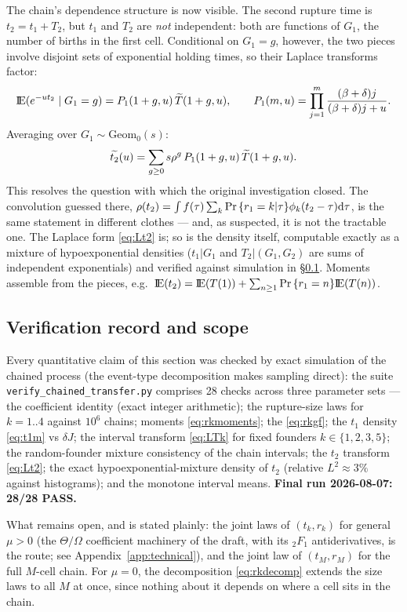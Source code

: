 The chain's dependence structure is now visible. The second rupture time is
$t_2=t_1+T_2$, but $t_1$ and $T_2$ are \emph{not} independent: both are
functions of $G_1$, the number of births in the first cell. Conditional on
$G_1=g$, however, the two pieces involve disjoint sets of exponential
holding times, so their Laplace transforms factor:
\begin{equation}
{\rm I}\!{\rm E}(e^{-ut_2}\mid G_1=g)
=P_1(1+g,u)\,\widetilde{T}(1+g,u),
\qquad
P_1(m,u)=\prod_{j=1}^{m}\frac{(\beta+\delta)j}{(\beta+\delta)j+u}.
\end{equation}
Averaging over $G_1\sim\mathrm{Geom}_0(s)$:
\begin{equation}
\widetilde{t_2}(u)
=\sum_{g\ge0} s\rho^g\,P_1(1+g,u)\,\widetilde{T}(1+g,u).
\label{eq:Lt2}
\end{equation}
This resolves the question with which the original investigation closed. The
convolution guessed there,
$\rho(t_2)=\int f(\tau)\sum_k{\text{Pr}\left\{r_1=k|\tau\right\}}\phi_k(t_2-\tau){\rm d}\tau$,
is the same statement in different clothes --- and, as suspected, it is not
the tractable one. The Laplace form \eqref{eq:Lt2} is; so is the density
itself, computable exactly as a mixture of hypoexponential densities
($t_1|G_1$ and $T_2|(G_1,G_2)$ are sums of independent exponentials) and
verified against simulation in \S\ref{sec:chained-verification}. Moments
assemble from the pieces, e.g.\
${\rm I}\!{\rm E}(t_2)={\rm I}\!{\rm E}(T(1))+\sum_{n\ge1}{\text{Pr}\left\{r_1=n\right\}}{\rm I}\!{\rm E}(T(n))$.

\subsection{Verification record and scope}
\label{sec:chained-verification}

Every quantitative claim of this section was checked by exact simulation of
the chained process (the event-type decomposition makes sampling direct):
the suite \texttt{verify\_chained\_transfer.py} comprises 28 checks across
three parameter sets --- the coefficient identity (exact integer
arithmetic); the rupture-size laws for $k=1..4$ against $10^6$ chains;
moments \eqref{eq:rkmoments}; the \pgf{} \eqref{eq:rkgf}; the $t_1$ density
\eqref{eq:t1m} vs $\delta J$; the interval transform \eqref{eq:LTk} for
fixed founders $k\in\{1,2,3,5\}$; the random-founder mixture consistency of
the chain intervals; the $t_2$ transform \eqref{eq:Lt2}; the exact
hypoexponential-mixture density of $t_2$ (relative $L^2\approx3\%$ against
histograms); and the monotone interval means. \textbf{Final run 2026-08-07:
28/28 PASS.}

What remains open, and is stated plainly: the joint laws of $(t_k,r_k)$ for
general $\mu>0$ (the $\Theta/\Omega$ coefficient machinery of the draft,
with its ${}_2F_1$ antiderivatives, is the route; see
Appendix~\ref{app:technical}), and the joint law of $(t_M,r_M)$ for the full
$M$-cell chain. For $\mu=0$, the decomposition \eqref{eq:rkdecomp} extends
the size laws to all $M$ at once, since nothing about it depends on where a
cell sits in the chain.
